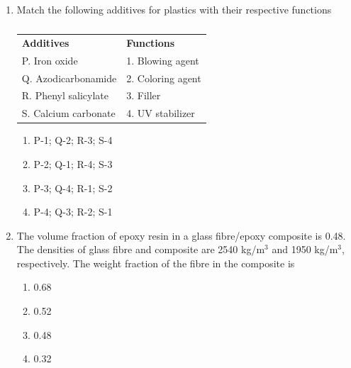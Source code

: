 \documentclass[a4paper,10pt]{article}
\begin{document}
\begin{enumerate}
\item Match the following additives for plastics with their respective functions
\begin{table}[H]
\centering
\begin{tabular}{ll}
\textbf{Additives} & \textbf{Functions} \\
P. Iron oxide & 1. Blowing agent \\
Q. Azodicarbonamide & 2. Coloring agent \\
R. Phenyl salicylate & 3. Filler \\
S. Calcium carbonate & 4. UV stabilizer \\
\end{tabular}
\caption*{}
\label{tab:q14_poly}
\end{table}
\hfill{}

\begin{multicols}{2}
\begin{enumerate}
\item P-1; Q-2; R-3; S-4
\item P-2; Q-1; R-4; S-3
\item P-3; Q-4; R-1; S-2
\item P-4; Q-3; R-2; S-1
\end{enumerate}
\end{multicols}

\item The volume fraction of epoxy resin in a glass fibre/epoxy composite is 0.48. The densities of glass fibre and composite are 2540 kg/m$^3$ and 1950 kg/m$^3$, respectively. The weight fraction of the fibre in the composite is
\hfill{}

\begin{multicols}{4}
\begin{enumerate}
\item 0.68
\item 0.52
\item 0.48
\item 0.32
\end{enumerate}
\end{multicols}


\end{enumerate}
\end{document}
